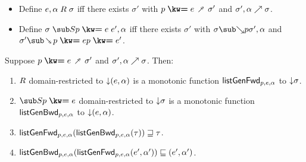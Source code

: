 \begin{lemma}
  \label{lem:aux:list-gen:gc}
  \item
  \begin{itemize}
    \item Define $e, \alpha \mathrel{R} \sigma $ iff there exists $\sigma'$ with $\clauseUncurried{p}{e} \desugarClauseFwd \sigma'$ and ${\sigma'},{\alpha} \nearrow {\sigma}$.
    \item Define $\sigma \listGenBwd{\clauseUncurried{p}{e}} e', \alpha$ iff there exists $\sigma'$ with $\totalisebwd{\sigma}{p}{\sigma'}{\alpha}$ and $\sigma' \desugarClauseBwd{\clauseUncurried{p}{e}} \clauseUncurried{p}{e'}$.
  \end{itemize}
  Suppose $\clauseUncurried{p}{e} \desugarClauseFwd \sigma'$ and ${\sigma'},{\alpha} \nearrow {\sigma}$. Then:
  \begin{enumerate}
     \item $\mathrel{R}$ domain-restricted to ${\downarrow}{(e, \alpha)}$ is a monotonic function $\mathsf{listGenFwd}_{p, e, \alpha}$ to ${\downarrow}{\sigma}$.
     \item $\listGenBwd{\clauseUncurried{p}{e}}$ domain-restricted to ${\downarrow}{\sigma}$ is a monotonic function $\mathsf{listGenBwd}_{p, e, \alpha}$ to ${\downarrow}{(e, \alpha)}$.
     \item $\mathsf{listGenFwd}_{p, e, \alpha}(\mathsf{listGenBwd}_{p, e, \alpha}(\tau)) \sqsupseteq \tau$.
     \item $\mathsf{listGenBwd}_{p, e, \alpha}(\mathsf{listGenFwd}_{p, e, \alpha}(e', \alpha')) \sqsubseteq (e', \alpha')$.
  \end{enumerate}
\end{lemma}
